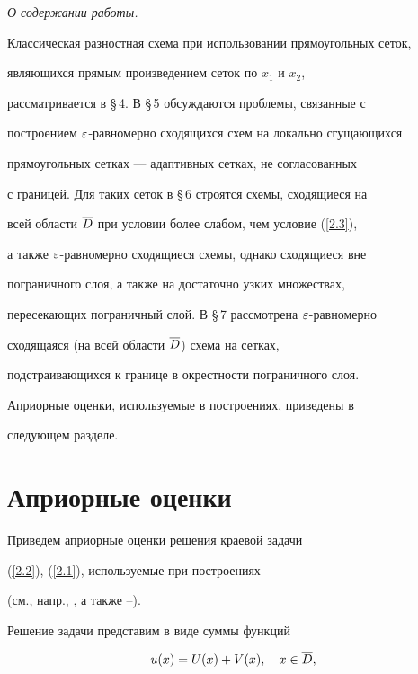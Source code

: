 {\em О содержании работы.}


Классическая разностная схема при использовании прямоугольных сеток,


являющихся прямым произведением сеток по $x_1$ и $x_2$,


рассматривается в \S\,4. В \S\,5 обсуждаются проблемы, связанные с


построением $\varepsilon$-равномерно сходящихся схем на локально сгущающихся


прямоугольных сетках --- адаптивных сетках, не согласованных


с границей. Для таких сеток в \S\,6 строятся схемы, сходящиеся на


всей области $\overline{D}$ при условии более слабом, чем условие (\ref{2.3}),


а также $\varepsilon$-равномерно сходящиеся схемы, однако сходящиеся вне


пограничного слоя, а также на достаточно узких множествах,


пересекающих пограничный слой. В \S\,7 рассмотрена $\varepsilon$-равномерно


сходящаяся (на всей области $\overline{D}$) схема на сетках,


подстраивающихся к границе в окрестности пограничного слоя.


Априорные оценки, используемые в построениях, приведены в


следующем разделе.





\section{Априорные оценки}\label{section.6}





Приведем априорные оценки решения краевой задачи


(\ref{2.2}), (\ref{2.1}), используемые при построениях


(см., напр., \cite{1}, а также \cite{2}--\cite{4}).





Решение задачи представим в виде суммы функций


\begin{equation} \label{6.1}


u(x)=U(x)+V(x),\quad x\in\Db,


\end{equation}



